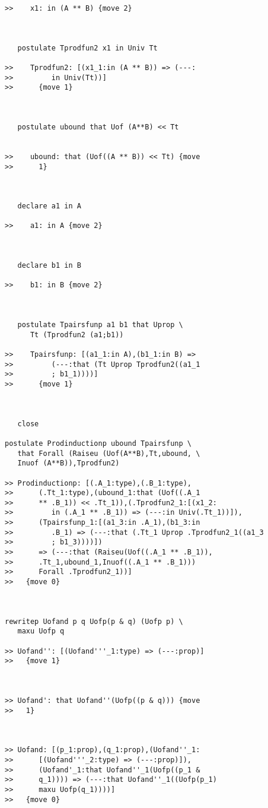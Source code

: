\documentclass{article}
\begin{document}
\begin{verbatim}
>>    x1: in (A ** B) {move 2}



   postulate Tprodfun2 x1 in Univ Tt

>>    Tprodfun2: [(x1_1:in (A ** B)) => (---:
>>         in Univ(Tt))]
>>      {move 1}



   postulate ubound that Uof (A**B) << Tt


>>    ubound: that (Uof((A ** B)) << Tt) {move
>>      1}



   declare a1 in A

>>    a1: in A {move 2}



   declare b1 in B

>>    b1: in B {move 2}



   postulate Tpairsfunp a1 b1 that Uprop \
      Tt (Tprodfun2 (a1;b1))

>>    Tpairsfunp: [(a1_1:in A),(b1_1:in B) =>
>>         (---:that (Tt Uprop Tprodfun2((a1_1
>>         ; b1_1))))]
>>      {move 1}



   close

postulate Prodinductionp ubound Tpairsfunp \
   that Forall (Raiseu (Uof(A**B),Tt,ubound, \
   Inuof (A**B)),Tprodfun2)

>> Prodinductionp: [(.A_1:type),(.B_1:type),
>>      (.Tt_1:type),(ubound_1:that (Uof((.A_1
>>      ** .B_1)) << .Tt_1)),(.Tprodfun2_1:[(x1_2:
>>         in (.A_1 ** .B_1)) => (---:in Univ(.Tt_1))]),
>>      (Tpairsfunp_1:[(a1_3:in .A_1),(b1_3:in
>>         .B_1) => (---:that (.Tt_1 Uprop .Tprodfun2_1((a1_3
>>         ; b1_3))))])
>>      => (---:that (Raiseu(Uof((.A_1 ** .B_1)),
>>      .Tt_1,ubound_1,Inuof((.A_1 ** .B_1)))
>>      Forall .Tprodfun2_1))]
>>   {move 0}



rewritep Uofand p q Uofp(p & q) (Uofp p) \
   maxu Uofp q

>> Uofand'': [(Uofand'''_1:type) => (---:prop)]
>>   {move 1}



>> Uofand': that Uofand''(Uofp((p & q))) {move
>>   1}



>> Uofand: [(p_1:prop),(q_1:prop),(Uofand''_1:
>>      [(Uofand'''_2:type) => (---:prop)]),
>>      (Uofand'_1:that Uofand''_1(Uofp((p_1 &
>>      q_1)))) => (---:that Uofand''_1((Uofp(p_1)
>>      maxu Uofp(q_1))))]
>>   {move 0}


\end{verbatim}
\end{document}
